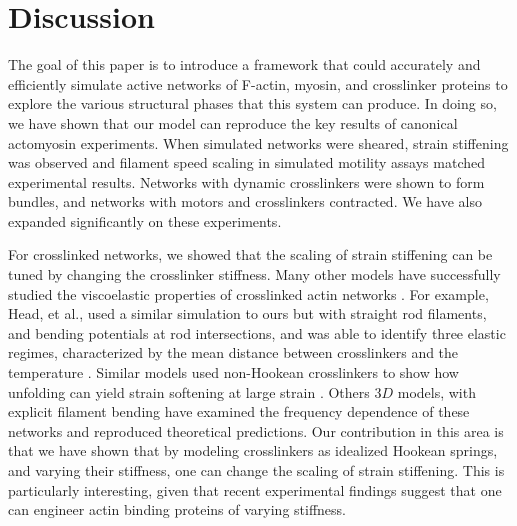 \documentclass[12pt]{article} \usepackage{times} \usepackage{graphicx}
\begin{document}
\section{Discussion} The goal of this paper is to introduce a framework that
could accurately and efficiently simulate active networks of F-actin, myosin,
and crosslinker proteins to explore the various structural phases that this
system can produce. In doing so, we have shown that our model can reproduce the
key results of canonical actomyosin experiments. When simulated networks were
sheared, strain stiffening was observed and filament speed scaling in simulated
motility assays matched experimental results. Networks with dynamic
crosslinkers were shown to form bundles, and networks with motors and
crosslinkers contracted.  We have also expanded significantly on these
experiments. 

\par For crosslinked networks, we showed that the scaling of strain stiffening
can be tuned by changing the crosslinker stiffness. Many other models have
successfully studied the viscoelastic properties of crosslinked actin networks
\cite{mackintosh1995, head2003, wilhelm2003, kim2009}.  For example, Head, et
al., used a similar simulation to ours but with straight rod filaments, and
bending potentials at rod intersections, and was able to identify three elastic
regimes, characterized by the mean distance between crosslinkers and the
temperature \cite{head2003}. Similar models used non-Hookean crosslinkers to
show how unfolding can yield strain softening at large strain
\cite{didonna2007}.  Others $3D$ models, with explicit filament bending have
examined the frequency dependence of these networks and reproduced theoretical
predictions\cite{gittes1998,kim2009,muller2014}.  Our contribution in this area
is that we have shown that by modeling crosslinkers as idealized Hookean
springs, and varying their stiffness, one can change the scaling of strain
stiffening.  This is particularly interesting, given that recent experimental
findings suggest that one can engineer actin binding proteins of varying
stiffness\cite{vieregg2016}.  
\end{document}
